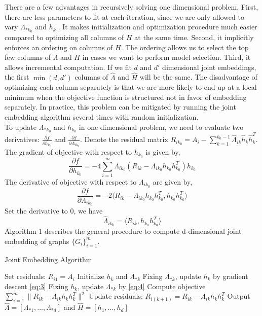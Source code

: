 \documentclass[10pt,journal,compsoc]{IEEEtran}
\begin{document}
\noindent There are a few advantages in recursively solving one dimensional problem. First, there are less parameters to fit at each iteration, since we are only allowed to vary $\Lambda_{*k_0}$ and $h_{k_0}$. It makes initialization and optimization procedure much easier compared to optimizing all columns of $H$ at the same time. Second, it implicitly enforces an ordering on columns of $H$. The ordering allows us to select the top few columns of $\Lambda$ and $H$ in cases we want to perform model selection. Third, it allows incremental computation. If we fit $d$ and $d'$ dimensional joint embeddings, the first $\min(d,d')$ columns of $\hat{\Lambda}$ and $\hat{H}$ will be the same. The disadvantage of optimizing each column separately is that we are more likely to end up at a local minimum when the objective function is structured not in favor of embedding separately. In practice, this problem can be mitigated by running the joint embedding algorithm several times with random initialization. \\ 

\noindent To update $\Lambda_{*k_0}$ and $h_{k_0}$ in one dimensional problem, we need to evaluate two derivatives: $\frac{\partial f}{\partial h_{k_0}}$ and $\frac{\partial f}{\partial \Lambda_{i k_0}}$. Denote the residual matrix $R_{ik_0}=A_i- \sum\limits_{k=1}^{k_0-1}\hat{\Lambda}_{ik} \hat{h}_{k} \hat{h}_{k}^T$. The gradient of objective with respect to $h_{k_0}$ is given by,
\begin{equation} \label{eq:3}
\frac{\partial f}{\partial h_{k_0}} = -4\sum\limits_{i=1}^{m}  \Lambda_{ik_0} (R_{ik}-\Lambda_{ik_0} h_{k_0} h_{k_0}^T)  h_{k_0}
\end{equation}
The derivative of objective with respect to $\Lambda_{i k_0}$ are given by,
\[\frac{\partial f}{\partial \Lambda_{i k_0}}= -2 \langle R_{ik}-\Lambda_{ik_0} h_{k_0} h_{k_0}^T,h_{k_0} h_{k_0}^T\rangle\]
Set the derivative to $0$, we have
\begin{equation}  \label{eq:4}
\hat{\Lambda}_{i k_0} = \langle R_{ik}, h_{k_0} h_{k_0}^T \rangle 
\end{equation}
Algorithm 1 describes the general procedure to compute d-dimensional joint embedding of graphs $\{G_i\}_{i=1}^m$. 

\begin{algorithm}
	\caption{Joint Embedding Algorithm}
	\begin{algorithmic}[1]
		\State Set residuals: $R_{i1}=A_i$
		\State Initialize $h_k$ and $\Lambda_{*k}$ 
		\State Fixing $\Lambda_{*k}$, update $h_k$ by gradient descent \eqref{eq:3}
		\State Fixing $h_k$, update $\Lambda_{*k}$ by \eqref{eq:4}
		\State Compute objective $\sum\limits_{i=1}^{m} \| R_{ik}-  \Lambda_{ik} h_k h_k^T \|^2$
		\EndWhile
		\State Update residuals: $R_{i(k+1)}=R_{ik}- \Lambda_{ik} h_kh_k^T$
		\EndFor
		\State Output $\hat{\Lambda}=[\Lambda_{*1},...,\Lambda_{*d}]$ and $\hat{H}=[h_1,...,h_d]$
		\EndProcedure
	\end{algorithmic}
\end{algorithm}
\end{document}
